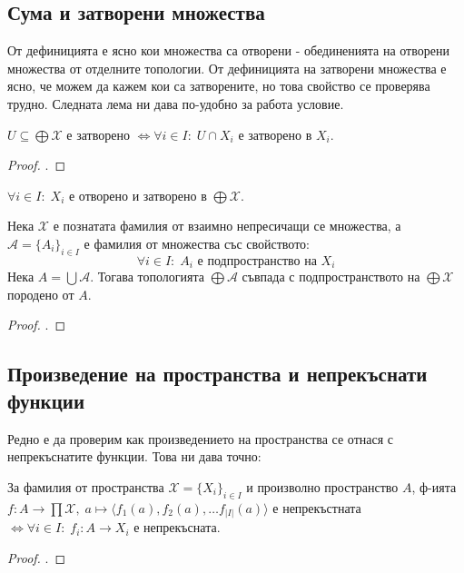 \subsection{Сума и затворени множества}
От дефиницията е ясно кои множества са отворени - обединенията на отворени множества от отделните топологии. От дефиницията на затворени множества е ясно, че можем да кажем кои са затворените, но това свойство се проверява трудно. Следната лема ни дава по-удобно за работа условие.
\begin{lemma}
    $U \subseteq \bigoplus \mathcal X$ е затворено $\iff \forall i \in I:\; U \cap X_i$ е затворено в $X_i$.
\end{lemma}
\begin{proof}
    \cite[стр.~74]{engelking1989general}.
\end{proof}

\begin{corollary}
    $\forall i \in I:\; X_i$ е отворено и затворено в $\bigoplus \mathcal X$.
\end{corollary}
\begin{proposition}
    Нека $\mathcal X$ е познатата фамилия от взаимно непресичащи се множества, а $\mathcal A = \{A_i\}_{i \in I}$ е фамилия от множества със свойството:
    \begin{equation*}
        \forall i\in I:\; A_i \text{ е подпространство на } X_i
    \end{equation*}
    Нека $A = \bigcup \mathcal A$. Тогава топологията $\bigoplus \mathcal A$ съвпада с подпространството на $\bigoplus \mathcal X$ породено от $A$.
\end{proposition}
\begin{proof}
    \cite[стр.~75]{engelking1989general}.
\end{proof}

\subsection{Произведение на пространства и непрекъснати функции}
Редно е да проверим как произведението на пространства се отнася с непрекъснатите функции. Това ни дава точно:
\begin{theorem}\label{th:sum-continuous}
    За фамилия от пространства $\mathcal X = \{X_i\}_{i \in I}$ и произволно пространство $A$, ф-ията $f : A \to \prod \mathcal X,\; a \mapsto \langle f_1(a), f_2(a), \dots f_{|I|}(a) \rangle$ е непрекъстната $\iff \forall i \in I:\; f_i: A \to X_i$ е непрекъсната.
\end{theorem}
\begin{proof}
    \cite[стр.~110]{munkrestopology}.
\end{proof}
